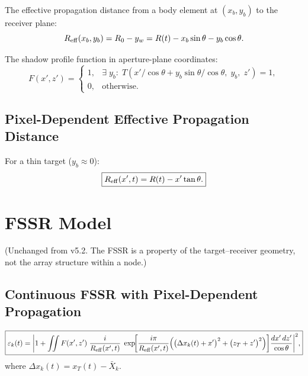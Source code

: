 \documentclass[11pt,a4paper]{article}
\begin{document}
The effective propagation distance from a body element at
$(x_b,y_b)$ to the receiver plane:
\begin{equation}
  R_{\rm eff}(x_b,y_b) = R_0 - y_w
  = R(t) - x_b\sin\theta - y_b\cos\theta.
  \label{eq:R_eff_general}
\end{equation}

The shadow profile function in aperture-plane coordinates:
\begin{equation}
  F(x',z') =
  \begin{cases}
    1, & \exists\;y_b:\;T(x'/\!\cos\theta + y_b\sin\theta/\!\cos\theta,
    \;y_b,\;z')=1,\\
    0, & \text{otherwise}.
  \end{cases}
  \label{eq:shadow_profile}
\end{equation}

\subsection{Pixel-Dependent Effective Propagation Distance}
\label{sec:pixel_R}

For a thin target ($y_b\approx 0$):
\begin{equation}
  \boxed{R_{\rm eff}(x',t) = R(t) - x'\tan\theta.}
  \label{eq:R_eff_pixel}
\end{equation}

\section{FSSR Model}
\label{sec:fssr}

(Unchanged from v5.2.  The FSSR is a property of the target--receiver
geometry, not the array structure within a node.)

\subsection{Continuous FSSR with Pixel-Dependent Propagation}

\begin{equation}
  \boxed{
  \varepsilon_k(t) = \biggl|1
  + \iint F(x',z')\;\frac{i}{R_{\rm eff}(x',t)}\;
  \exp\!\biggl[\frac{i\pi}{R_{\rm eff}(x',t)}\Bigl(
  \bigl(\Delta x_k(t)+x'\bigr)^2
  + \bigl(z_T+z'\bigr)^2\Bigr)\biggr]
  \frac{dx'\,dz'}{\cos\theta}\biggr|^2,}
  \label{eq:fssr_continuous}
\end{equation}
where $\Delta x_k(t)=x_T(t)-\bar{X}_k$.
\end{document}
